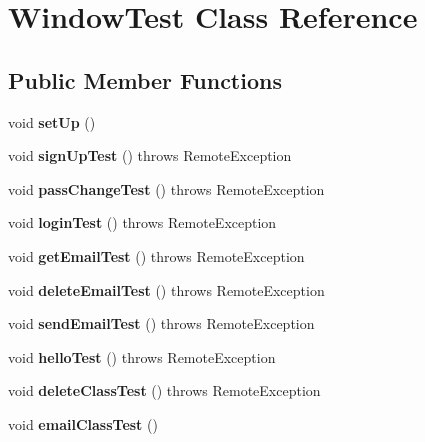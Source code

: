 \hypertarget{class_window_test}{}\section{Window\+Test Class Reference}
\label{class_window_test}
\subsection*{Public Member Functions}
\begin{DoxyCompactItemize}
\item 
\mbox{\label{class_window_test_a23f4768bcb10070dd2201c392b18215e}} 
void {\bfseries set\+Up} ()
\item 
\mbox{\label{class_window_test_a009c6c8d54ebf517d747d3ac6a59c416}} 
void {\bfseries sign\+Up\+Test} ()  throws Remote\+Exception 
\item 
\mbox{\label{class_window_test_a1343dc9276005c5d5b64ab5b844e665f}} 
void {\bfseries pass\+Change\+Test} ()  throws Remote\+Exception 
\item 
\mbox{\label{class_window_test_a11f876a65af8afcad111927914caaf14}} 
void {\bfseries login\+Test} ()  throws Remote\+Exception 
\item 
\mbox{\label{class_window_test_ac4d8df65e85499d4f902a3fd4e69fc55}} 
void {\bfseries get\+Email\+Test} ()  throws Remote\+Exception 
\item 
\mbox{\label{class_window_test_a1da07b8ebcfb20f62e501e8d845ac1c8}} 
void {\bfseries delete\+Email\+Test} ()  throws Remote\+Exception 
\item 
\mbox{\label{class_window_test_a1c650f13b5330c5caf8b4b18e5669bec}} 
void {\bfseries send\+Email\+Test} ()  throws Remote\+Exception 
\item 
\mbox{\label{class_window_test_a93240d837e5ab179eb7c8fa602c987a2}} 
void {\bfseries hello\+Test} ()  throws Remote\+Exception 
\item 
\mbox{\label{class_window_test_aea5404003a54766a4d78c0fc92381418}} 
void {\bfseries delete\+Class\+Test} ()  throws Remote\+Exception 
\item 
\mbox{\label{class_window_test_aeb395b08c31ecbe18a14c77903718450}} 
void {\bfseries email\+Class\+Test} ()
\end{DoxyCompactItemize}
